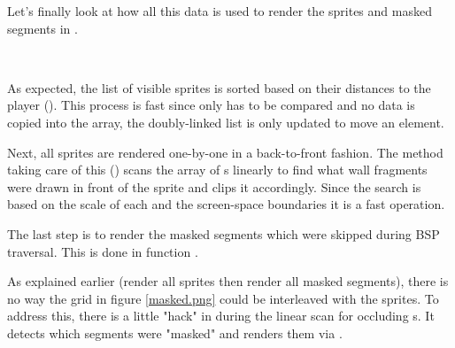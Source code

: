 Let's finally look at how all this data is used to render the sprites and masked segments in .\\
\par
{}\\
\par
As expected, the list of visible sprites is sorted based on their distances to the player (). This process is fast since only  has to be compared and no data is copied into the array, the doubly-linked list is only updated to move an element.\\
\par
Next, all sprites are rendered one-by-one in a back-to-front fashion. The method taking care of this () scans the array of s linearly to find what wall fragments were drawn in front of the sprite and clips it accordingly. Since the search is based on the scale of each  and the screen-space  boundaries it is a fast operation.\\
\par
The last step is to render the masked segments which were skipped during BSP traversal. This is done in function .\\
\par 
As explained earlier (render all sprites then render all masked segments), there is no way the grid in figure \ref{masked.png} could be interleaved with the sprites. To address this, there is a little "hack" in  during the linear scan for occluding s. It detects which segments were "masked" and renders them via .\\
\pagebreak



